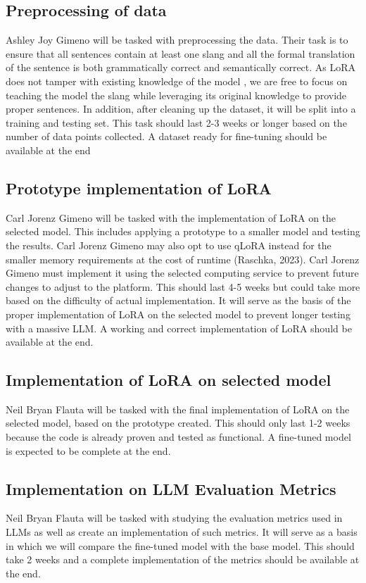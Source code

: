 \subsection{Preprocessing of data} 
Ashley Joy Gimeno will be tasked with preprocessing the data. Their task is to ensure that all sentences contain at least one slang and all the formal translation of the sentence is both grammatically correct and semantically correct. As LoRA does not tamper with existing knowledge of the model \cite{hu2021loralowrankadaptationlarge}, we are free to focus on teaching the model the slang while leveraging its original knowledge to provide proper sentences. In addition, after cleaning up the dataset, it will be split into a training and testing set. This task should last 2-3 weeks or longer based on the number of data points collected. A dataset ready for fine-tuning should be available at the end

\subsection{Prototype implementation of LoRA}
Carl Jorenz Gimeno will be tasked with the implementation of LoRA on the selected model. This includes applying a prototype to a smaller model and testing the results. Carl Jorenz Gimeno may also opt to use qLoRA instead for the smaller memory requirements at the cost of runtime (Raschka, 2023). Carl Jorenz Gimeno  must implement it using the selected computing service to prevent future changes to adjust to the platform. This should last 4-5 weeks but could take more based on the difficulty of actual implementation. It will serve as the basis of the proper implementation of LoRA on the selected model to prevent longer testing with a massive LLM. A working and correct implementation of LoRA should be available at the end.

\subsection{Implementation of LoRA on selected model}
Neil Bryan Flauta will be tasked with the final implementation of LoRA on the selected model, based on the prototype created. This should only last 1-2 weeks because the code is already proven and tested as functional. A fine-tuned model is expected to be complete at the end.

\subsection{Implementation on LLM Evaluation Metrics}
Neil Bryan Flauta will be tasked with studying the evaluation metrics used in LLMs as well as create an implementation of such metrics. It will serve as a basis in which we will compare the fine-tuned model with the base model. This should take 2 weeks and a complete implementation of the metrics should be available at the end.

